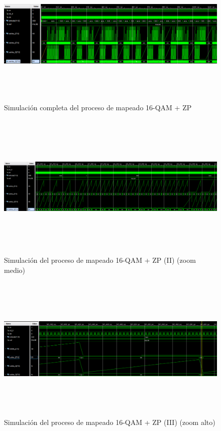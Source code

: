 \begin{figure}
	\centering
	\includegraphics[width=1\textwidth, height=7cm]{img/simu/process_qam_2.PNG}
	\caption{Simulación completa del proceso de mapeado 16-QAM + ZP}
	\label{fig:proc2}
\end{figure}

\clearpage

\begin{figure}
	\centering
	\includegraphics[width=1\textwidth, height=7cm]{img/simu/process_qam_3.PNG}
	\caption{Simulación del proceso de mapeado 16-QAM + ZP (II) (zoom medio)}
	\label{fig:proc3}
\end{figure}

\clearpage

\begin{figure}
	\centering
	\includegraphics[width=1\textwidth, height=7cm]{img/simu/process_qam.PNG}
	\caption{Simulación del proceso de mapeado 16-QAM + ZP (III) (zoom alto)}
	\label{fig:proc1}
\end{figure}

